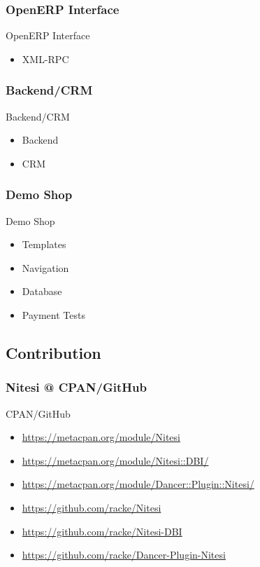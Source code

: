 \subsubsection{OpenERP Interface}
\begin{frame}{OpenERP Interface} 
  \begin{itemize}
  \item XML-RPC
  \end{itemize}
\end{frame}

\subsubsection{Backend/CRM}
\begin{frame}{Backend/CRM} 
  \begin{itemize}
  \item Backend
  \item CRM
  \end{itemize}
\end{frame}

\subsubsection{Demo Shop}
\begin{frame}{Demo Shop} 
  \begin{itemize}
  \item Templates
  \item Navigation
  \item Database
  \item Payment Tests
  \end{itemize}
\end{frame}

\subsection{Contribution}
\subsubsection{Nitesi @ CPAN/GitHub}
\begin{frame}{CPAN/GitHub}
\begin{itemize}
\item \url{https://metacpan.org/module/Nitesi}
\item \url{https://metacpan.org/module/Nitesi::DBI/}
\item \url{https://metacpan.org/module/Dancer::Plugin::Nitesi/}
\end{itemize}
\begin{itemize}
\item \url{https://github.com/racke/Nitesi}
\item \url{https://github.com/racke/Nitesi-DBI}
\item \url{https://github.com/racke/Dancer-Plugin-Nitesi}
\end{itemize}
\end{frame}

